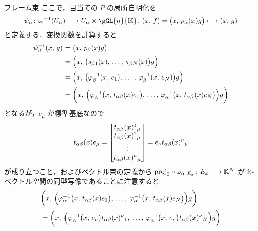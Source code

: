 \documentclass[geometry_main]{subfiles}
\begin{document}
\begin{myexample}[label=def:framebundle]{フレーム束}
    ここで，目当ての \underline{$P$ の}局所自明化を
    \begin{align}
        \psi_\alpha \colon \varpi^{-1}(U_\alpha) \lto U_\alpha \times \gGL{n}{\mathbb{K}},\; (x,\, f) = \bigl(x,\, p_\alpha (x) g\bigr)\lmto (x,\, g)
    \end{align}
    と定義する．変換関数を計算すると
    \begin{align}
        \psi_\beta^{-1}(x,\, g) 
        &= \bigl(x,\, p_\beta (x) g\bigr) \\
        &= \Bigl(x,\, \bigl(s_\beta{}_1(x),\, \dots,\, s_\beta{}_N(x)\bigr) g\Bigr) \\
        &= \Bigl(x,\, \bigl(\varphi_\beta^{-1}(x,\, e_1),\, \dots,\, \varphi_\beta^{-1}(x,\, e_N)\bigr) g\Bigr) \\
        &= \biggl(x,\, \Bigl(\varphi_\alpha^{-1}\bigl(x,\, t_{\alpha\beta}(x) e_1\bigr),\, \dots,\, \varphi_\alpha^{-1}\bigl(x,\, t_{\alpha\beta}(x) e_N\bigr)\Bigr) g\biggr) 
    \end{align}
    となるが，$e_\mu$ が標準基底なので
    \begin{align}
        t_{\alpha\beta}(x) e_\mu = \mqty[t_{\alpha\beta}(x)^1{}_\mu \\ t_{\alpha\beta}(x)^2{}_\mu \\ \vdots \\ t_{\alpha\beta}(x)^n{}_\mu] = e_\nu t_{\alpha\beta}(x)^\nu{}_\mu
    \end{align}
    が成り立つこと，および\hyperref[def:vect]{ベクトル束の定義}から $\mathrm{proj}_2 \circ \varphi_\alpha|_{E_x} \colon E_x \longrightarrow \mathbb{K}^N$ が $\mathbb{K}$-ベクトル空間の同型写像であることに注意すると
    \begin{align}
        &\biggl(x,\, \Bigl(\varphi_\alpha^{-1}\bigl(x,\, t_{\alpha\beta}(x) e_1\bigr),\, \dots,\, \varphi_\alpha^{-1}\bigl(x,\, t_{\alpha\beta}(x) e_N\bigr)\Bigr) g\biggr) \\
        &= \biggl(x,\, \Bigl(\varphi_\alpha^{-1}\bigl(x,\, e_\nu\bigr) t_{\alpha\beta}(x)^\nu{}_1,\, \dots,\, \varphi_\alpha^{-1}\bigl(x,\, e_\nu\bigr)t_{\alpha\beta}(x)^\nu{}_N\Bigr) g\biggr) \\

\end{align}
\end{myexample}
\end{document}
